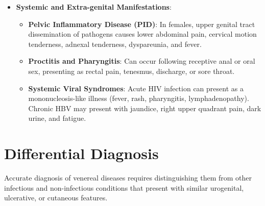 \begin{itemize}
    \begin{itemize}
        \item \textbf{Secondary Syphilis}: Occurs weeks to months after the resolution of the primary chancre, representing systemic spirochetemia. It presents with a diffuse, non-pruritic, maculopapular rash that characteristically involves the palms of the hands and soles of the feet. Other features include mucous patches in the oral cavity or genitals, alopecia, constitutional symptoms (fever, malaise, sore throat), generalized lymphadenopathy, and condyloma lata (flat, moist, highly infectious papules in intertriginous areas).
        \item \textbf{Genital Warts (Condyloma Acuminata)}: Cauliflower-like, flesh-coloured, or hyperpigmented exophytic growths on the vulva, penis, perianal skin, or scrotum, caused by HPV infection. They are generally painless but can cause itching, bleeding, or cosmetic distress.
    \end{itemize}
    \item \textbf{Systemic and Extra-genital Manifestations}:
    \begin{itemize}
        \item \textbf{Pelvic Inflammatory Disease (PID)}: In females, upper genital tract dissemination of pathogens causes lower abdominal pain, cervical motion tenderness, adnexal tenderness, dyspareunia, and fever.
        \item \textbf{Proctitis and Pharyngitis}: Can occur following receptive anal or oral sex, presenting as rectal pain, tenesmus, discharge, or sore throat.
        \item \textbf{Systemic Viral Syndromes}: Acute HIV infection can present as a mononucleosis-like illness (fever, rash, pharyngitis, lymphadenopathy). Chronic HBV may present with jaundice, right upper quadrant pain, dark urine, and fatigue.
    \end{itemize}
\end{itemize}

\section*{Differential Diagnosis}
Accurate diagnosis of venereal diseases requires distinguishing them from other infectious and non-infectious conditions that present with similar urogenital, ulcerative, or cutaneous features.

